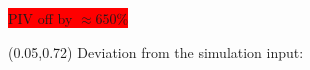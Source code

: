 {\begin{textblock}{0.28}
\colorbox{red}{PIV off by $\approx 650\%$}
\end{textblock}

\begin{textblock}{0.9}(0.05,0.72)
	\centering
	Deviation from the simulation input:
\end{textblock}
}






